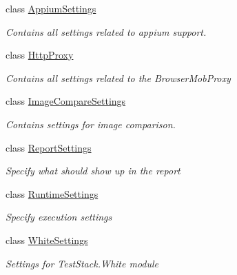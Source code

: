 \begin{DoxyCompactItemize}
\item 
class \hyperlink{class_proto_test_1_1_golem_1_1_core_1_1_config_settings_1_1_appium_settings}{Appium\-Settings}
\begin{DoxyCompactList}\small\item\em Contains all settings related to appium support. \end{DoxyCompactList}\item 
class \hyperlink{class_proto_test_1_1_golem_1_1_core_1_1_config_settings_1_1_http_proxy}{Http\-Proxy}
\begin{DoxyCompactList}\small\item\em Contains all settings related to the Browser\-Mob\-Proxy \end{DoxyCompactList}\item 
class \hyperlink{class_proto_test_1_1_golem_1_1_core_1_1_config_settings_1_1_image_compare_settings}{Image\-Compare\-Settings}
\begin{DoxyCompactList}\small\item\em Contains settings for image comparison. \end{DoxyCompactList}\item 
class \hyperlink{class_proto_test_1_1_golem_1_1_core_1_1_config_settings_1_1_report_settings}{Report\-Settings}
\begin{DoxyCompactList}\small\item\em Specify what should show up in the report \end{DoxyCompactList}\item 
class \hyperlink{class_proto_test_1_1_golem_1_1_core_1_1_config_settings_1_1_runtime_settings}{Runtime\-Settings}
\begin{DoxyCompactList}\small\item\em Specify execution settings \end{DoxyCompactList}\item 
class \hyperlink{class_proto_test_1_1_golem_1_1_core_1_1_config_settings_1_1_white_settings}{White\-Settings}
\begin{DoxyCompactList}\small\item\em Settings for Test\-Stack.\-White module \end{DoxyCompactList}\end{DoxyCompactItemize}
